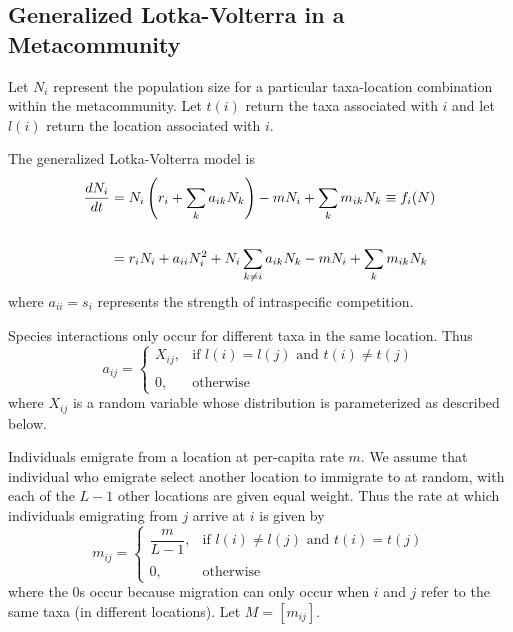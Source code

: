 \documentclass{article}
\begin{document}
\subsection*{Generalized Lotka-Volterra in a Metacommunity}

Let $N_i$ represent the population size for a particular taxa-location combination within the metacommunity. Let $t(i)$ return the taxa associated with $i$ and let $l(i)$ return the location associated with $i$.

The generalized Lotka-Volterra model is
\begin{align}
\dfrac{dN_i}{dt} 
&= N_i\left(r_i+\sum_k a_{ik}N_k\right)-mN_i+\sum_k m_{ik}N_k \equiv f_i(N) \\
\notag\\
&=r_iN_i + a_{ii}N_i^2 + N_i\sum_{k\neq i} a_{ik}N_k - mN_i + \sum_k m_{ik} N_k
\end{align}
where $a_{ii} = s_i$ represents the strength of intraspecific competition.

Species interactions only occur for different taxa in the same location. Thus
\begin{equation}
    a_{ij} = 
    \left\{
        \begin{array}{ll}
            X_{ij}, & \text{if } l(i) = l(j) \text{ and } t(i) \neq t(j)\\
            \\
            0, & \text{otherwise}
            \end{array}
            \right.
\end{equation}
where $X_{ij}$ is a random variable whose distribution is parameterized as described below. 

Individuals emigrate from a location at per-capita rate $m$. We assume that individual who emigrate select another location to immigrate to at random, with each of the $L-1$ other locations are given equal weight. Thus the rate at which individuals emigrating from $j$ arrive at $i$ is given by
\begin{equation}
    m_{ij} = 
    \left\{
        \begin{array}{ll}
            \dfrac{m}{L-1}, & \text{if } l(i) \neq l(j) \text{ and } t(i) = t(j) \\
            \\
            0, & \text{otherwise}
        \end{array}
        \right.
\end{equation}
where the 0s occur because migration can only occur when $i$ and $j$ refer to the same taxa (in different locations). Let $M = [m_{ij}]$.
\end{document}
